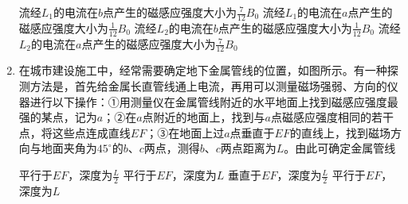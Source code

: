 \begin{enumerate}
\fourchoices
{流经$ L_{1} $的电流在$ b $点产生的磁感应强度大小为$\frac { 7 } { 12 } B _ { 0 }$ }
{流经$ L_{1} $的电流在$ a $点产生的磁感应强度大小为$\frac { 1 } { 12 } B _ { 0 }$ }
{流经$ L_{2} $的电流在$ b $点产生的磁感应强度大小为$\frac { 1 } { 12 } B _ { 0 }$ }
{流经$ L_{2} $的电流在$ a $点产生的磁感应强度大小为$\frac { 7 } { 12 } B _ { 0 }$}






\item
{}
在城市建设施工中，经常需要确定地下金属管线的位置，如图所示。有一种探测方法是，首先给金属长直管线通上电流，再用可以测量磁场强弱、方向的仪器进行以下操作：①用测量仪在金属管线附近的水平地面上找到磁感应强度最强的某点，记为$ a $；②在$ a $点附近的地面上，找到与$ a $点磁感应强度相同的若干点，将这些点连成直线$ EF $；③在地面上过$ a $点垂直于$ EF $的直线上，找到磁场方向与地面夹角为$ 45 ^{\circ} $的$ b $、$ c $两点，测得$ b $、$ c $两点距离为$ L $。由此可确定金属管线  
\begin{figure}[h!]
\centering

\end{figure}

\fourchoices
{平行于$ EF $，深度为$ \frac{L}{2} $}
{平行于$ EF $，深度为$ L $}
{垂直于$ EF $，深度为$ \frac{L}{2} $}
{平行于$ EF $，深度为$ L $}





\end{enumerate}








